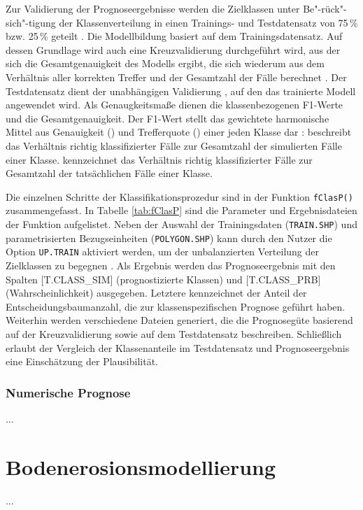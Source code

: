 Zur Validierung der Prognoseergebnisse werden die Zielklassen unter Be"-rück"-sich"-tigung der Klassenverteilung in einen Trainings- und Testdatensatz von 75\,\% bzw. 25\,\% geteilt . Die Modellbildung basiert auf dem Trainingsdatensatz. Auf dessen Grundlage wird auch eine Kreuzvalidierung durchgeführt wird, aus der sich die Gesamtgenauigkeit des Modells ergibt, die sich wiederum aus dem Verhältnis aller korrekten Treffer und der Gesamtzahl der Fälle berechnet \citep{Stehmann1997rse}. Der Testdatensatz dient der unabhängigen Validierung \citep{KhaledianMiller2020amm}, auf den das trainierte Modell angewendet wird. Als Genaugkeitsmaße dienen die klassenbezogenen F1-Werte und die Gesamtgenauigkeit. Der F1-Wert stellt das gewichtete harmonische Mittel aus Genauigkeit () und Trefferquote () einer jeden Klasse dar \citep{Manning-etal2008}:  beschreibt das Verhältnis richtig klassifizierter Fälle zur Gesamtzahl der simulierten Fälle einer Klasse.   kennzeichnet das Verhältnis richtig klassifizierter Fälle zur Gesamtzahl der tatsächlichen Fälle einer Klasse.\ 

Die einzelnen Schritte der Klassifikationsprozedur sind in der Funktion \texttt{fClasP()} zusammengefasst. In Tabelle \ref{tab:fClasP} sind die Parameter und Ergebnisdateien der Funktion aufgelistet. Neben der Auswahl der Trainingsdaten (\texttt{TRAIN.SHP}) und parametrisierten Bezugseinheiten (\texttt{POLYGON.SHP}) kann durch den Nutzer die Option \texttt{UP.TRAIN} aktiviert werden, um der unbalanzierten Verteilung der Zielklassen zu begegnen \citep{Taghizadeh-Mehrjardi-etal2020}. Als Ergebnis werden das Prognoseergebnis mit den Spalten [T.CLASS\_SIM] (prognostizierte Klassen) und [T.CLASS\_PRB] (Wahrscheinlichkeit) ausgegeben. Letztere kennzeichnet der Anteil der Entscheidungsbaumanzahl, die zur klassenspezifischen Prognose geführt haben. Weiterhin werden verschiedene Dateien generiert, die die Prognosegüte basierend auf der Kreuzvalidierung sowie auf dem Testdatensatz beschreiben. Schließlich erlaubt der Vergleich der Klassenanteile im Testdatensatz und Prognoseergebnis eine Einschätzung der Plausibilität.

\subsubsection{Numerische Prognose}
$\dots$
\section{Bodenerosionsmodellierung}
$\dots$

\newpage











